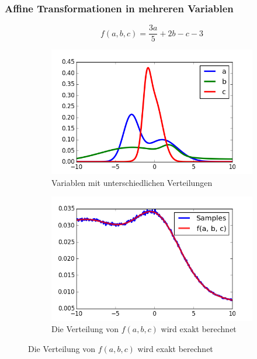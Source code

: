 \documentclass[11pt]{beamer}
\begin{document}
\begin{frame}
  \frametitle{Affine Transformationen in mehreren Variablen}

  \begin{equation*}
    f(a, b, c) = \frac{3a}{5} + 2b - c - 3
  \end{equation*}

  \begin{figure}
    \centering
    \begin{subfigure}[t]{0.45\textwidth}
      \centering
      \includegraphics[width=\textwidth]{thesis/operations/affine-vars}
      \caption{Variablen mit unterschiedlichen Verteilungen}
    \end{subfigure}
    \hfill
    \begin{subfigure}[t]{0.45\textwidth}
      \centering
      \includegraphics[width=\textwidth]{thesis/operations/affine-result}
      \caption{Die Verteilung von $f(a, b, c)$ wird exakt berechnet}
    \end{subfigure}
  \end{figure}
\end{frame}
\end{document}
